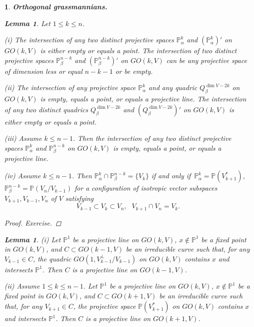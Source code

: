 \documentclass[12pt]{amsart}
\newtheorem{lemma}[theorem]{Lemma}
\newtheorem{sub}[subsection]{}
\theoremstyle{definition}
\begin{document}
\begin{sub}{\bf Orthogonal grassmannians.}
\begin{lemma}\label{two possib} Let $1\le k\le n$.

(i) The intersection of any two distinct projective spaces $\mathbb{P}^k_{\alpha}$ and
$(\mathbb{P}^k_{\alpha})'$ on $GO(k,V)$
is either empty or equals a point. The intersection of two distinct projective spaces $\mathbb{P}^{n-k}_{\beta}$ and $(\mathbb{P}^{n-k}_{\beta})'$ on $GO(k,V)$ can be any projective space of dimension less or equal $n-k-1$ or be empty.

(ii) The intersection of any projective space $\mathbb{P}^k_{\alpha}$ and any quadric
$Q^{\dim V-2k}_{\beta}$ on $GO(k,V)$ is empty, equals a point, or equals a projective line. The intersection of any two
distinct quadrics $Q^{\dim V-2k}_{\beta}$ and $(Q^{\dim V-2k}_{\beta})'$ on $GO(k,V)$ is either empty or equals a point.



(iii) Assume $k\le n-1$. Then the intersection of any two distinct projective spaces $\mathbb{P}^k_{\alpha}$ and $\mathbb{P}^{n-k}_{\beta}$
on $GO(k,V)$ is empty, equals a point, or equals a projective line.

(iv) Assume $k\le n-1$. Then $\mathbb{P}^k_{\alpha}\cap \mathbb{P}^{n-k}_{\beta}=\{V_k\}$ if and only if\
$\mathbb{P}^k_{\alpha}=\mathbb{P}(V_{k+1}^*)$, $\mathbb{P}^{n-k}_{\beta}=\mathbb{P}(V_n/V_{k-1})$ for a configuration
of isotropic vector subspaces $V_{k+1},V_{k-1},V_n$ of $V$ satisfying
$$
V_{k-1}\subset V_k\subset V_n,\ \ \ V_{k+1}\cap V_n=V_k.
$$
\end{lemma}

\begin{proof} Exercise.
\end{proof}


\begin{lemma}\label{family CO}
(i) Let $\mathbb{P}^1$ be a projective line on $GO(k,V)$, $x\not\in\mathbb{P}^1$ be a fixed
point in $GO(k,V)$, and $C\subset GO(k-1,V)$ be an irreducible curve such that, for any $V_{k-1}\in C$, the quadric
$GO(1,V_{k-1}^\bot/V_{k-1})$ on $GO(k,V)$ contains $x$ and intersects $\mathbb{P}^1$. Then $C$
is a projective line on $GO(k-1,V)$.

(ii) Assume $1\le k\le n-1$. Let $\mathbb{P}^1$ be a projective
line on $GO(k,V)$, $x\not\in\mathbb{P}^1$ be a fixed point in $GO(k,V)$, and $C\subset GO(k+1,V)$ be an
irreducible curve such that, for any $V_{k+1}\in C$, the projective space $\mathbb{P}(V_{k+1}^*)$ on $GO(k,V)$ contains
$x$ and intersects $\mathbb{P}^1$. Then $C$ is a projective line on $GO(k+1,V)$.
\end{lemma}


\end{sub}
\end{document}
